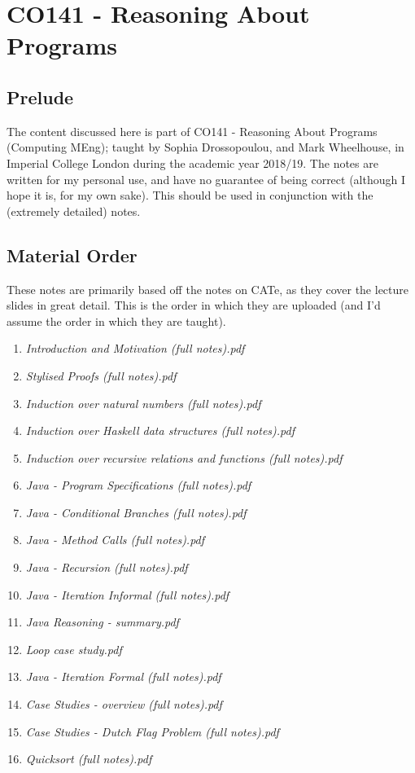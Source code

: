 \documentclass[a4paper, 12pt]{article}
\begin{document}
    \setlength{\abovedisplayskip}{2pt}
    \setlength{\belowdisplayskip}{5pt}
    \setlength{\abovedisplayshortskip}{0pt}
    \setlength{\belowdisplayshortskip}{0pt}
    \section*{CO141 - Reasoning About Programs}
        \subsection*{Prelude}
            The content discussed here is part of CO141 - Reasoning About Programs (Computing MEng); taught by Sophia Drossopoulou, and Mark Wheelhouse, in Imperial College London during the academic year 2018/19. The notes are written for my personal use, and have no guarantee of being correct (although I hope it is, for my own sake). This should be used in conjunction with the (extremely detailed) notes.
        \subsection*{Material Order}
            These notes are primarily based off the notes on CATe, as they cover the lecture slides in great detail. This is the order in which they are uploaded (and I'd assume the order in which they are taught).
            \begin{enumerate}[1.]
                \itemsep0em
                \item \textit{Introduction and Motivation (full notes).pdf}
                \item \textit{Stylised Proofs (full notes).pdf}
                \item \textit{Induction over natural numbers (full notes).pdf}
                \item \textit{Induction over Haskell data structures (full notes).pdf}
                \item \textit{Induction over recursive relations and functions (full notes).pdf}
                \item \textit{Java - Program Specifications (full notes).pdf}
                \item \textit{Java - Conditional Branches (full notes).pdf}
                \item \textit{Java - Method Calls (full notes).pdf}
                \item \textit{Java - Recursion (full notes).pdf}
                \item \textit{Java - Iteration Informal (full notes).pdf}
                \item \textit{Java Reasoning - summary.pdf}
                \item \textit{Loop case study.pdf}
                \item \textit{Java - Iteration Formal (full notes).pdf}
                \item \textit{Case Studies - overview (full notes).pdf}
                \item \textit{Case Studies - Dutch Flag Problem (full notes).pdf}
                \item \textit{Quicksort (full notes).pdf}
            \end{enumerate}
\end{document}
